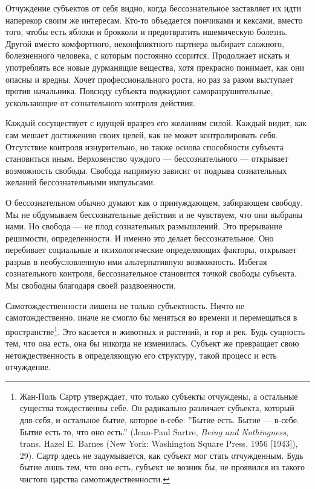 \documentclass[12pt]{book}
\begin{document}
Отчуждение субъектов от себя видно, когда бессознательное заставляет их идти наперекор своим же интересам. Кто-то объедается пончиками и кексами, вместо того, чтобы есть яблоки и брокколи и предотвратить ишемическую болезнь. Другой вместо комфортного, неконфликтного партнера выбирает сложного, болезненного человека, с которым постоянно ссорится. Продолжает искать и употреблять все новые дурманящие вещества, хотя прекрасно понимает, как они опасны и вредны. Хочет профессионального роста, но раз за разом выступает против начальника. Повсюду субъекта поджидают саморазрушительные, ускользающие от сознательного контроля действия.

Каждый сосуществует с идущей вразрез его желаниям силой. Каждый видит, как сам мешает достижению своих целей, как не может контролировать себя. Отсутствие контроля изнурительно, но также основа способности субъекта становиться иным. Верховенство чуждого --- бессознательного --- открывает возможность свободы. Свобода напрямую зависит от подрыва сознательных желаний бессознательными импульсами.

О бессознательном обычно думают как о принуждающем, забирающем свободу. Мы не обдумываем бессознательные действия и не чувствуем, что они выбраны нами. Но свобода --- не плод сознательных размышлений. Это прерывание решимости, определенности. И именно это делает бессознательное. Оно перебивает социальные и психологические определяющих факторы, открывает разрыв в необусловленную ими альтернативную возможность. Избегая сознательного контроля, бессознательное становится точкой свободы субъекта. Мы свободны благодаря своей раздвоенности.

Самотождественности лишена не только субъектность. Ничто не самотождественно, иначе не смогло бы меняться во времени и перемещаться в пространстве\footnote{Жан-Поль Сартр утверждает, что только субъекты отчуждены, а остальные существа тождественны себе. Он радикально различает субъекта, который для-себя, и остальное бытие, которое в-себе: ''Бытие есть. Бытие --- в-себе. Бытие есть то, что оно есть.'' (Jean-Paul Sartre, \textit{Being and Nothingness}, trans. Hazel E. Barnes (New York: Washington Square Press, 1956 [1943]), 29). Сартр здесь не задумывается, как субъект мог стать отчужденным. Будь бытие лишь тем, что оно есть, субъект не возник бы, не проявился из такого чистого царства самотождественности.}. Это касается и животных и растений, и гор и рек. Будь сущность тем, что она есть, она бы никогда не изменилась. Субъект же превращает свою нетождественность в определяющую его структуру, такой процесс и есть отчуждение.
\end{document}
